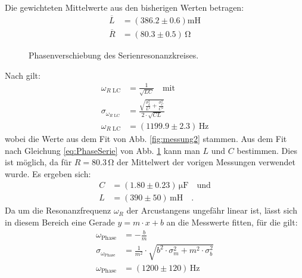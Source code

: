 \documentclass[12pt,a4paper,titlepage,headinclude,bibtotoc]{scrartcl}
\begin{document}
Die gewichteten Mittelwerte aus den bisherigen Werten betragen:
\begin{align*}
\overline L&=(386.2 \pm 0.6)\si{\milli\henry}\\
\overline R&=(80.3 \pm 0.5)\,\si{\ohm}
\end{align*}
\begin{figure}[!htb]
	\centering
	
	\caption{Phasenverschiebung des Serienresonanzkreises.}
	\label{fig:phase}
\end{figure}
Nach \cite[S. 954]{tipler} gilt: 
\begin{align*}
\omega_{R\text{ LC}}&=\frac{1}{\sqrt{LC}}\quad \text{mit}\\
\sigma_{\omega_{R\text{ LC}}}&=\frac{\sqrt{\frac{\sigma_{L}^{2}}{L^{2}} + \frac{\sigma_{C}^{2}}{C^{2}}}}{2 \cdot \sqrt{CL}}\\
\omega_{R\text{ LC}}&=(1199.9 \pm 2.3)\,\si{\hertz}
\end{align*}
wobei die Werte aus dem Fit von Abb. \ref{fig:messung2} stammen.
Aus dem Fit nach Gleichung \eqref{eq:PhaseSerie} von Abb. \ref{fig:phase} kann man $L$ und $C$ bestimmen.
Dies ist möglich, da für $R=80.3\,\si\ohm$ der Mittelwert der vorigen Messungen verwendet wurde.
Es ergeben sich:
\begin{align*}
C&= (1.80 \pm 0.23)\,\si{\micro\farad}\quad\text{und}\\ 
L&= (390\pm 50)\,\si{\milli\henry}\quad .
\end{align*}
Da um die Resonanzfrequenz $\omega_R$ der Arcustangens ungefähr linear ist, lässt sich in diesem Bereich eine Gerade $y=m\cdot x+b$ an die Messwerte fitten, für die gilt:
\begin{align*}
\omega_\text{Phase}&=- \frac{b}{m}\\
\sigma_{\omega_\text{Phase}}&=\frac{1}{m^{2}} \cdot \sqrt{b^{2} \cdot \sigma_{m}^{2} + m^{2} \cdot \sigma_{b}^{2}}\\
\omega_\text{Phase}&=(1200 \pm 120)\,\si\hertz
\end{align*}
\end{document}
